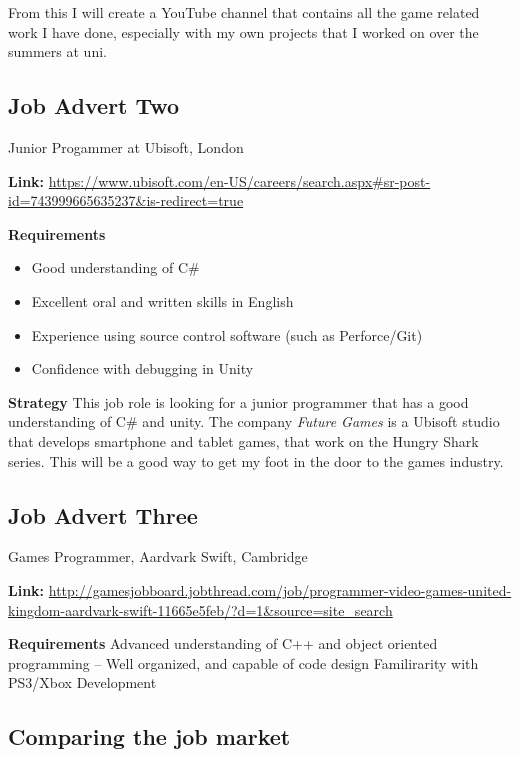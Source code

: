 \documentclass{scrartcl}
\begin{document}
From this I will create a YouTube channel that contains all the game related work I have done, especially with my own projects that I worked on over the summers at uni.








\subsection{Job Advert Two}
Junior Progammer at Ubisoft, London \cite{JobTwo}

\textbf{Link:} \url{https://www.ubisoft.com/en-US/careers/search.aspx#sr-post-id=743999665635237&is-redirect=true}

\textbf{Requirements}
\begin{itemize}
	\item Good understanding of C\# 
	\item Excellent oral and written skills in English
	\item Experience using source control software (such as Perforce/Git)
	\item Confidence with debugging in Unity
\end{itemize}

\textbf{Strategy}
This job role is looking for a junior programmer that has a good understanding of C\# and unity. 
The company \textit{Future Games} is a Ubisoft studio that develops smartphone and tablet games, that work on the Hungry Shark series.
This will be a good way to get my foot in the door to the games industry.
 









\subsection{Job Advert Three}
Games Programmer, Aardvark Swift, Cambridge

\textbf{Link:}
\url{http://gamesjobboard.jobthread.com/job/programmer-video-games-united-kingdom-aardvark-swift-11665e5feb/?d=1&source=site_search}


\textbf{Requirements}
Advanced understanding of C++ and object oriented programming
– Well organized, and capable of code design
Familirarity with PS3/Xbox Development





\subsection{Comparing the job market}
\end{document}
